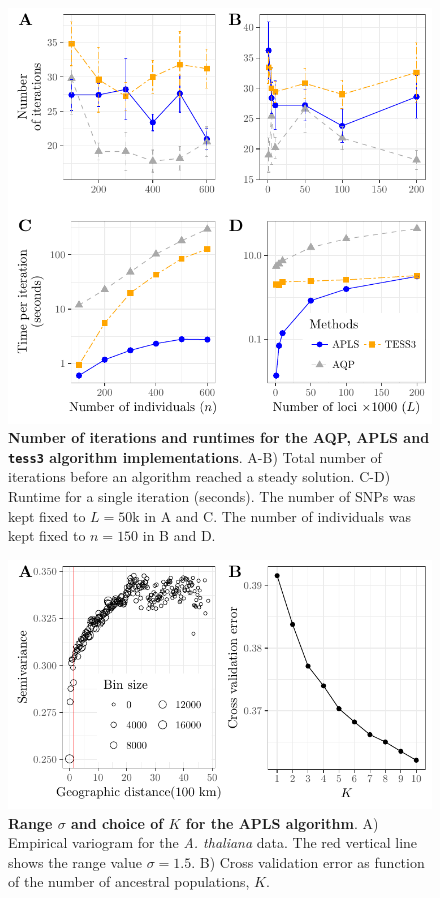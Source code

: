 \begin{figure}
  \centering
  \includegraphics[width=\textwidth]{./Figures/figure4.pdf}
  \caption{{\bf Number of iterations and runtimes for the AQP, APLS and {\tt
        tess3} algorithm implementations}. A-B) Total number of iterations
    before an algorithm reached a steady solution. C-D) Runtime for a single
    iteration (seconds). The number of SNPs was kept fixed to $L = 50$k in A and
    C. The number of individuals was kept fixed to $n = 150$ in B and D.}
  \label{fig:fig4}
\end{figure}

\clearpage 
\newpage

\begin{figure}
  \centering
\includegraphics[width=\textwidth]{./Figures/figure5.pdf}
\caption{{\bf Range $\sigma$ and choice of $K$ for the APLS algorithm}. A)
  Empirical variogram for the {\it A. thaliana} data. The red vertical line
  shows the range value $\sigma = 1.5$. B) Cross validation error as function of
  the number of ancestral populations, $K$.}
  \label{fig:fig5}
\end{figure}

